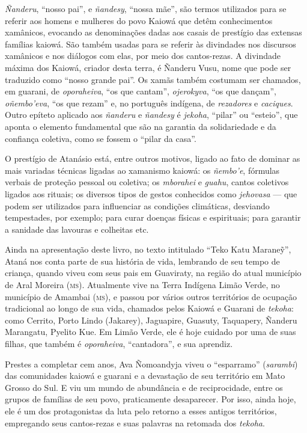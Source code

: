 \textit{Ñanderu}, ``nosso pai'', e \textit{ñandesy}, ``nossa mãe'', são
termos utilizados para se referir aos homens e mulheres do povo Kaiowá
que detêm conhecimentos xamânicos, evocando as denominações dadas aos
casais de prestígio das extensas famílias kaiowá. São também usadas para se
referir às divindades nos discursos xamânicos e nos diálogos com elas,
por meio dos cantos-rezas. A divindade máxima dos Kaiowá, criador desta
terra, é Ñanderu Vusu, nome que pode ser traduzido como ``nosso grande
pai''. Os xamãs também costumam ser chamados, em guarani, de
\textit{oporaheiva}, ``os que cantam'', \textit{ojerokyva}, ``os que
dançam'', \textit{oñembo'eva}, ``os que rezam'' e, no português indígena,
de \textit{rezadores} e \textit{caciques}. Outro epíteto aplicado aos
\textit{ñanderu} e \textit{ñandesy} é \textit{jekoha}, ``pilar'' ou ``esteio'',
que aponta o elemento fundamental que são na garantia da solidariedade e
da confiança coletiva, como se fossem o ``pilar da casa''.

O prestígio de Atanásio está, entre outros motivos, ligado ao fato de
dominar as mais variadas técnicas ligadas ao xamanismo kaiowá: os
\textit{ñembo'e}, fórmulas verbais de proteção pessoal ou coletiva; os
\textit{mborahei} e \textit{guahu}, cantos coletivos ligados aos rituais; os
diversos tipos de gestos conhecidos como \textit{jehovasa} --- que podem ser
utilizados para influenciar as condições climáticas, desviando
tempestades, por exemplo; para curar doenças físicas e espirituais; para
garantir a sanidade das lavouras e colheitas etc.

Ainda na apresentação deste livro, no texto intitulado ``Teko Katu Maraneỹ'', Ataná nos conta
parte de sua história de vida, lembrando de seu tempo de criança, quando
viveu com seus pais em Guaviraty, na região do atual município de Aral
Moreira (\textsc{ms}). Atualmente vive na Terra Indígena Limão Verde, no
município de Amambai (\textsc{ms}), e passou por vários outros territórios de ocupação tradicional ao longo de sua vida, chamados pelos
Kaiowá e Guarani de \textit{tekoha}: como Cerrito, Porto Lindo (Jakarey),
Jaguapire, Guasuty, Taquapery, Ñanderu Marangatu, Pyelito Kue. Em Limão
Verde, ele é hoje cuidado por uma de suas filhas, que também é
\textit{oporaheiva}, ``cantadora'', e sua aprendiz.

Prestes a completar cem anos, Ava Ñomoandyja viveu o ``esparramo''
(\textit{sarambi}) das comunidades kaiowá e guarani e a devastação de seu
território em Mato Grosso do Sul. E viu um mundo de abundância e de
reciprocidade, entre os grupos de famílias de seu povo, praticamente
desaparecer. Por isso, ainda hoje, ele é um dos protagonistas da luta
pelo retorno a esses antigos territórios, empregando seus cantos-rezas e
suas palavras na retomada dos \textit{tekoha}.
